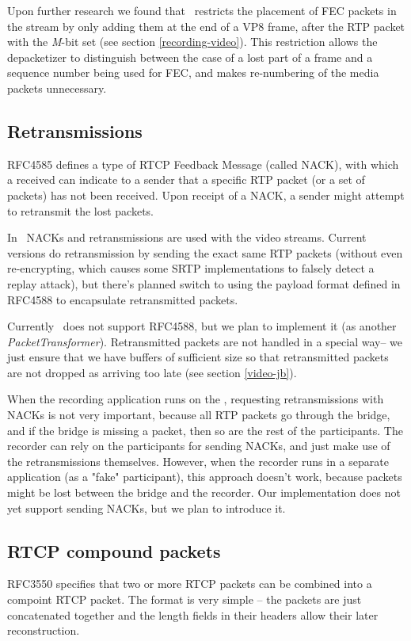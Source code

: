 \documentclass[twoside,openright,a4paper,12pt,english]{article}
\begin{document}
Upon further research we found that \wrtc\ restricts the placement of FEC
packets in the stream by only adding them at the end of a VP8 frame, after the
RTP packet with the \emph{M}-bit set (see section \ref{recording-video}). This
restriction allows the depacketizer to distinguish between the case of a lost
part of a frame and a sequence number being used for FEC, and makes re-numbering
of the media packets unnecessary.




\subsection{Retransmissions}
\label{rtx}
RFC4585\cite{rfc4585} defines a type of RTCP Feedback Message (called NACK), with
which a received can indicate to a sender that a specific RTP packet (or a set
of packets) has not been received. Upon receipt of a NACK, a sender might attempt to
retransmit the lost packets. 

In \wrtc\ NACKs and retransmissions are used with
the video streams. Current versions do retransmission by sending the exact same
RTP packets (without even re-encrypting, which causes some SRTP implementations
to falsely detect a replay attack), but there's planned switch to using the
payload format defined in RFC4588\cite{rfc4588} to encapsulate retransmitted packets.

Currently \lj\ does not support RFC4588, but we plan to implement it (as
another \emph{PacketTransformer}). Retransmitted packets are not handled in a
special way-- we just ensure that we have
buffers of sufficient size so that retransmitted packets are not dropped as arriving too late (see section \ref{video-jb}).

\medskip
When the recording application runs on the \jvb, requesting retransmissions with NACKs is not
very important, because all RTP packets go through the bridge, and if the
bridge is missing a packet, then so are the rest of the participants. The recorder can
rely on the participants for sending NACKs, and just make use of the retransmissions themselves.  
However, when the recorder runs in a separate application (as a "fake"
participant), this approach doesn't work, because packets might be lost between
the bridge and the recorder. Our implementation does not yet support sending NACKs, but we plan
to introduce it.




\subsection{RTCP compound packets}
RFC3550 specifies that two or more RTCP packets can be combined into a compoint
RTCP packet. The format is very simple -- the packets are just concatenated
together and the length fields in their headers allow their later
reconstruction.
\end{document}
